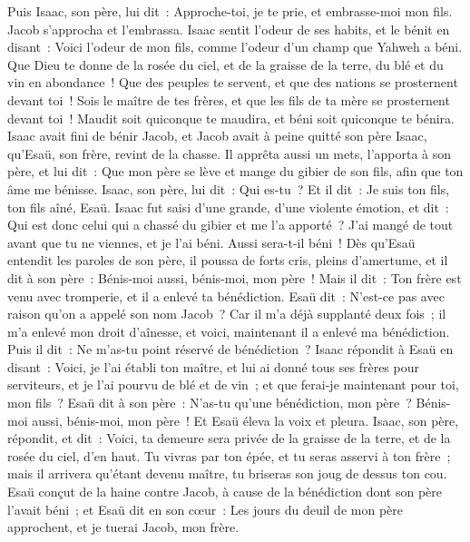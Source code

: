 \begin{multicols}{2}
Puis Isaac, son père, lui dit~: Approche-toi, je te prie, et embrasse-moi mon fils.
Jacob s'approcha et l'embrassa. Isaac sentit l'odeur de ses habits, et le bénit en disant~: Voici l'odeur de mon fils, comme l'odeur d'un champ que Yahweh a béni.
Que Dieu te donne de la rosée du ciel, et de la graisse de la terre, du blé et du vin en abondance~!
Que des peuples te servent, et que des nations se prosternent devant toi~! Sois le maître de tes frères, et que les fils de ta mère se prosternent devant toi~! Maudit soit quiconque te maudira, et béni soit quiconque te bénira.
Isaac avait fini de bénir Jacob, et Jacob avait à peine quitté son père Isaac, qu'Esaü, son frère, revint de la chasse.
Il apprêta aussi un mets, l'apporta à son père, et lui dit~: Que mon père se lève et mange du gibier de son fils, afin que ton âme me bénisse.
Isaac, son père, lui dit~: Qui es-tu~? Et il dit~: Je suis ton fils, ton fils aîné, Esaü.
Isaac fut saisi d'une grande, d'une violente émotion, et dit~: Qui est donc celui qui a chassé du gibier et me l'a apporté~? J'ai mangé de tout avant que tu ne viennes, et je l'ai béni. Aussi sera-t-il béni~!
Dès qu'Esaü entendit les paroles de son père, il poussa de forts cris, pleins d'amertume, et il dit à son père~: Bénis-moi aussi, bénis-moi, mon père~!
Mais il dit~: Ton frère est venu avec tromperie, et il a enlevé ta bénédiction.
Esaü dit~: N'est-ce pas avec raison qu'on a appelé son nom Jacob~? Car il m'a déjà supplanté deux fois~; il m'a enlevé mon droit d'aînesse, et voici, maintenant il a enlevé ma bénédiction. Puis il dit~: Ne m'as-tu point réservé de bénédiction~?
Isaac répondit à Esaü en disant~: Voici, je l'ai établi ton maître, et lui ai donné tous ses frères pour serviteurs, et je l'ai pourvu de blé et de vin~; et que ferai-je maintenant pour toi, mon fils~?
Esaü dit à son père~: N'as-tu qu'une bénédiction, mon père~? Bénis-moi aussi, bénis-moi, mon père~! Et Esaü éleva la voix et pleura.
Isaac, son père, répondit, et dit~: Voici, ta demeure sera privée de la graisse de la terre, et de la rosée du ciel, d'en haut.
Tu vivras par ton épée, et tu seras asservi à ton frère~; mais il arrivera qu'étant devenu maître, tu briseras son joug de dessus ton cou.
Esaü conçut de la haine contre Jacob, à cause de la bénédiction dont son père l'avait béni~; et Esaü dit en son cœur~: Les jours du deuil de mon père approchent, et je tuerai Jacob, mon frère.

\end{multicols}
